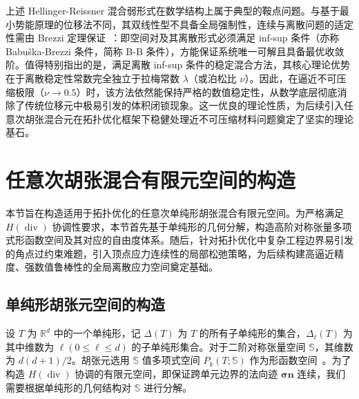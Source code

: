 上述 Hellinger-Reissner 混合弱形式在数学结构上属于典型的鞍点问题。与基于最小势能原理的位移法不同，其双线性型不具备全局强制性，连续与离散问题的适定性需由 Brezzi 定理保证~\cite{brezziMixedHybridFinite1991}：即空间对及其离散形式必须满足 inf-sup 条件（亦称 Babuška-Brezzi 条件，简称 B-B 条件），方能保证系统唯一可解且具备最优收敛阶。值得特别指出的是，满足离散 inf-sup 条件的稳定混合方法，其核心理论优势在于离散稳定性常数完全独立于拉梅常数 $\lambda$（或泊松比 $\nu$）。因此，在逼近不可压缩极限（$\nu\to 0.5$）时，该方法依然能保持严格的数值稳定性，从数学底层彻底消除了传统位移元中极易引发的体积闭锁现象。这一优良的理论性质，为后续引入任意次胡张混合元在拓扑优化框架下稳健处理近不可压缩材料问题奠定了坚实的理论基石。


\section{任意次胡张混合有限元空间的构造}
\label{sec:hz_space_construction}

本节旨在构造适用于拓扑优化的任意次单纯形胡张混合有限元空间。为严格满足 $H(\operatorname{div})$ 协调性要求，本节首先基于单纯形的几何分解，构造高阶对称张量多项式形函数空间及其对应的自由度体系。随后，针对拓扑优化中复杂工程边界易引发的角点过约束难题，引入顶点应力连续性的局部松弛策略，为后续构建高逼近精度、强数值鲁棒性的全局离散应力空间奠定基础。


\subsection{单纯形胡张元空间的构造}
\label{subsec:hz_space_construct}

设 $T$ 为 $\mathbb{R}^d$ 中的一个单纯形，记 $\Delta({T})$ 为 $T$ 的所有子单纯形的集合，$\Delta_{\ell}(T)$ 为其中维数为 $\ell(0\leq\ell\leq{d})$ 的子单纯形集合。对于二阶对称张量空间 $\mathbb{S}$，其维数为 $d(d+1)/2$。胡张元选用 $\mathbb{S}$ 值多项式空间 $P_k(T; \mathbb{S})$ 作为形函数空间~\cite{huFiniteElementApproximations2015}。为了构造 $H(\operatorname{div})$ 协调的有限元空间，即保证跨单元边界的法向迹 $\boldsymbol{\sigma}\boldsymbol{n}$ 连续，我们需要根据单纯形的几何结构对 $\mathbb{S}$ 进行分解。


